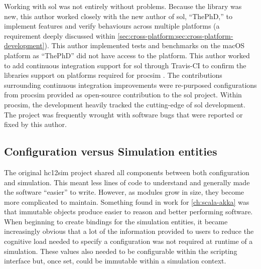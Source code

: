 Working with sol was not entirely without problems. Because the library was new, this author worked closely with the new author of sol, ``ThePhD,'' to implement features and verify behaviours across multiple platforms (a requirement deeply discussed within \cref{sec:cross-platform:sec:cross-platform-development}). This author implemented tests and benchmarks on the macOS platform as ``ThePhD'' did not have access to the platform. This author worked to add continuous integration support for sol through Travis-CI \cite{TravisCI} to confirm the libraries support on platforms required for procsim \cite{Github:ThePhD:sol2:pr:17, Github:ThePhD:sol2:pr:18}. The contributions surrounding continuous integration improvements were re-purposed configurations from procsim provided as open-source contribution to the sol project. Within procsim, the development heavily tracked the cutting-edge of sol development. The project was frequently wrought with software bugs that were reported or fixed by this author. 

\subsection{Configuration versus Simulation entities}

The original hc12sim project shared all components between both configuration and simulation. This meant less lines of code to understand and generally made the software ``easier'' to write. However, as modules grow in size, they become more complicated to maintain. Something found in work for \cref{ch:scala-akka} was that immutable objects produce easier to reason and better performing software. When beginning to create bindings for the simulation entities, it became increasingly obvious that a lot of the information provided to users to reduce the cognitive load needed to specify a configuration was not required at runtime of a simulation. These values also needed to be configurable within the scripting interface but, once set, could be immutable within a simulation context.

